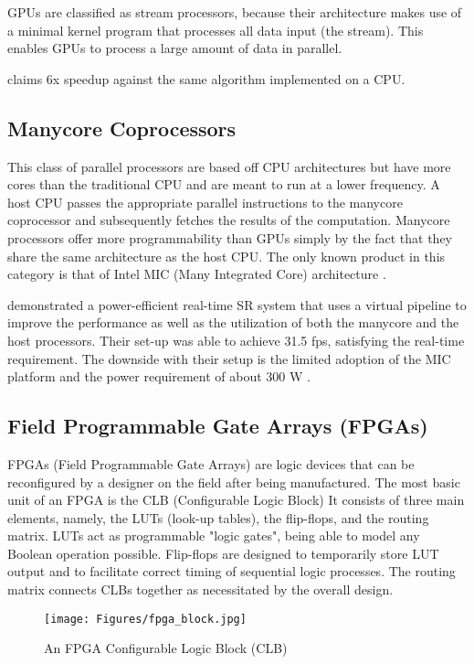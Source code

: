 GPUs are classified as stream processors, because their architecture makes use of a minimal kernel program that processes all data input (the stream). 
This enables GPUs to process a large amount of data in parallel. 

\cite{Wu2011} claims 6x speedup against the same algorithm implemented on a CPU. 

\subsection{Manycore Coprocessors}
This class of parallel processors are based off CPU architectures but have more cores than the traditional CPU and are meant to run at a lower frequency. 
A host CPU passes the appropriate parallel instructions to the manycore coprocessor and subsequently fetches the results of the computation.
Manycore processors offer more programmability than GPUs simply by the fact that they share the same architecture as the host CPU. 
The only known product in this category is that of Intel MIC (Many Integrated Core) architecture \citep{Intel2014}.

\cite{Ishizaka2013} demonstrated a power-efficient real-time SR system that uses a virtual pipeline to improve the performance as well as the utilization of both the manycore and the host processors. 
Their set-up was able to achieve 31.5 fps, satisfying the real-time requirement.
The downside with their setup is the limited adoption of the MIC platform and the power requirement of about 300 W \citep{Intel2014}.


\subsection{Field Programmable Gate Arrays (FPGAs)}
FPGAs (Field Programmable Gate Arrays) are logic devices that can be reconfigured by a designer on the field after being manufactured.
The most basic unit of an FPGA is the CLB (Configurable Logic Block)
It consists of three main elements, namely, the LUTs (look-up tables), the flip-flops, and the routing matrix.
LUTs act as programmable "logic gates", being able to model any Boolean operation possible. 
Flip-flops are designed to temporarily store LUT output and to facilitate correct timing of sequential logic processes. 
The routing matrix connects CLBs together as necessitated by the overall design.

\begin{figure}
	\centering
	\texttt{[image: Figures/fpga\_block.jpg]}
	\label{fig:fpga_block}
	\caption[]{An FPGA Configurable Logic Block (CLB)}
\end{figure}

